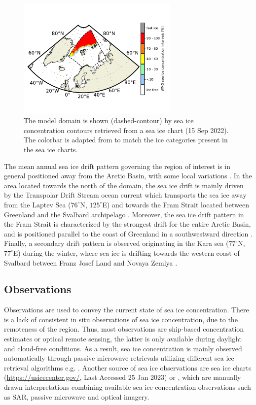 \documentclass[../main/thesis.tex]{subfiles}
\begin{document}
\begin{figure}
    \centering
    \includegraphics[width = 0.7\textwidth]{study_area.pdf}
    \caption{\label{fig:studyarea}The model domain is shown (dashed-contour) by sea ice concentration contours retrieved from a sea ice chart (15 Sep 2022). The colorbar is adapted from \protect\citet{WMO2014} to match the ice categories present in the sea ice charts.}
\end{figure}

The mean annual sea ice drift pattern governing the region of interest is in general positioned away from the Arctic Basin, with some local variations \citep{Barry1993}. In the area located towards the north of the domain, the sea ice drift is mainly driven by the Transpolar Drift Stream ocean current which transports the sea ice away from the Laptev Sea ($76^\circ$N, $125^\circ$E) and towards the Fram Strait located between Greenland and the Svalbard archipelago \citep{Colony1984}. Moreover, the sea ice drift pattern in the Fram Strait is characterized by the strongest drift for the entire Arctic Basin, and is positioned parallel to the coast of Greenland in a southwestward direction \citep{Barry1993}. Finally, a secondary drift pattern is observed originating in the Kara sea ($77^\circ$N, $77^\circ$E) during the winter, where sea ice is drifting towards the western coast of Svalbard between Franz Josef Land and Novaya Zemlya \citep{Kaur2018}.

\subsection{Observations}
Observations are used to convey the current state of sea ice concentration. There is a lack of consistent in situ observations of sea ice concentration, due to the remoteness of the region. Thus, most observations are ship-based concentration estimates \citep{Kern2019} or optical remote sensing, the latter is only available during daylight and cloud-free conditions. As a result, sea ice concentration is mainly observed automatically through passive microwave retrievals utilizing different sea ice retrieval algorithms e.g. \citep{Comiso1997,Spreen2008, Lavergne2019a}. Another source of sea ice observations are sea ice charts (\url{https://usicecenter.gov/}, Last Accessed 25 Jan 2023) or \citep{Dinessen2020}, which are manually drawn interpretations combining available sea ice concentration observations such as SAR, passive microwave and optical imagery. 
\end{document}
